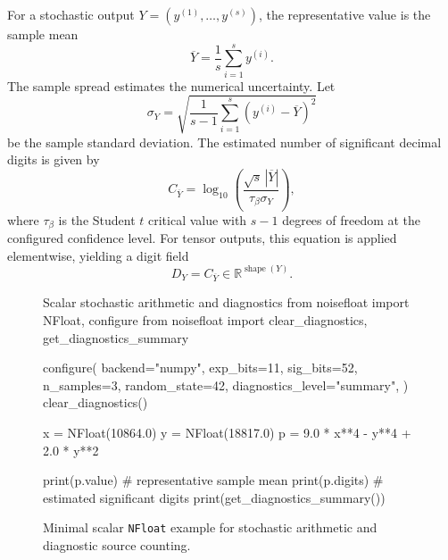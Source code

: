 \documentclass[manuscript, screen]{acmart}
\begin{document}
For a stochastic output $Y=(y^{(1)},\ldots,y^{(s)})$, the representative value is the sample mean
\begin{equation}
\overline{Y}=\frac{1}{s}\sum_{i=1}^{s}y^{(i)}.
\label{eq:representative_value}
\end{equation}
The sample spread estimates the numerical uncertainty. Let
\begin{equation}
\sigma_Y=
\sqrt{\frac{1}{s-1}\sum_{i=1}^{s}\left(y^{(i)}-\overline{Y}\right)^2}
\end{equation}
be the sample standard deviation. The estimated number of significant decimal digits is given by
\begin{equation}\label{eq:significant_digit}
C_{\overline{Y}}
=
\log_{10}
\left(
\frac{\sqrt{s}\,|\overline{Y}|}{\tau_{\beta}\sigma_Y}
\right),
\end{equation}
where $\tau_{\beta}$ is the Student $t$ critical value with $s-1$ degrees of freedom at the configured confidence level. For tensor outputs, this equation is applied elementwise, yielding a digit field
\begin{equation}
D_Y = C_{\overline{Y}} \in \mathbb{R}^{\operatorname{shape}(Y)}.
\end{equation}



\begin{figure}[htp]
\centering
\begin{pythoncode}[label={lst:scalar-diagnostics}]{Scalar stochastic arithmetic and diagnostics}
from noisefloat import NFloat, configure
from noisefloat import clear_diagnostics, get_diagnostics_summary

configure(
    backend="numpy",
    exp_bits=11,
    sig_bits=52,
    n_samples=3,
    random_state=42,
    diagnostics_level="summary",
)
clear_diagnostics()

x = NFloat(10864.0)
y = NFloat(18817.0)
p = 9.0 * x**4 - y**4 + 2.0 * y**2

print(p.value)                  # representative sample mean
print(p.digits)                 # estimated significant digits
print(get_diagnostics_summary())
\end{pythoncode}
\caption{Minimal scalar \texttt{NFloat} example for stochastic arithmetic and diagnostic source counting.}\label{fig:scalar-diagnostics}
\end{figure}
\end{document}
